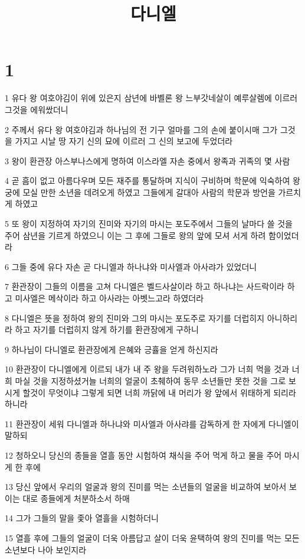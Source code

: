 

\title{다니엘}


\chapter{1}

\par 1 유다 왕 여호야김이 위에 있은지 삼년에 바벨론 왕 느부갓네살이 예루살렘에 이르러 그것을 에워쌌더니
\par 2 주께서 유다 왕 여호야김과 하나님의 전 기구 얼마를 그의 손에 붙이시매 그가 그것을 가지고 시날 땅 자기 신의 묘에 이르러 그 신의 보고에 두었더라
\par 3 왕이 환관장 아스부나스에게 명하여 이스라엘 자손 중에서 왕족과 귀족의 몇 사람
\par 4 곧 흠이 없고 아름다우며 모든 재주를 통달하며 지식이 구비하며 학문에 익숙하여 왕궁에 모실 만한 소년을 데려오게 하였고 그들에게 갈대아 사람의 학문과 방언을 가르치게 하였고
\par 5 또 왕이 지정하여 자기의 진미와 자기의 마시는 포도주에서 그들의 날마다 쓸 것을 주어 삼년을 기르게 하였으니 이는 그 후에 그들로 왕의 앞에 모셔 서게 하려 함이었더라
\par 6 그들 중에 유다 자손 곧 다니엘과 하나냐와 미사엘과 아사랴가 있었더니
\par 7 환관장이 그들의 이름을 고쳐 다니엘은 벨드사살이라 하고 하나냐는 사드락이라 하고 미사엘은 메삭이라 하고 아사랴는 아벳느고라 하였더라
\par 8 다니엘은 뜻을 정하여 왕의 진미와 그의 마시는 포도주로 자기를 더럽히지 아니하리라 하고 자기를 더럽히지 않게 하기를 환관장에게 구하니
\par 9 하나님이 다니엘로 환관장에게 은혜와 긍휼을 얻게 하신지라
\par 10 환관장이 다니엘에게 이르되 내가 내 주 왕을 두려워하노라 그가 너희 먹을 것과 너희 마실 것을 지정하셨거늘 너희의 얼굴이 초췌하여 동무 소년들만 못한 것을 그로 보시게 할것이 무엇이냐 그렇게 되면 너희 까닭에 내 머리가 왕 앞에서 위태하게 되리라 하니라
\par 11 환관장이 세워 다니엘과 하나냐와 미사엘과 아사랴를 감독하게 한 자에게 다니엘이 말하되
\par 12 청하오니 당신의 종들을 열흘 동안 시험하여 채식을 주어 먹게 하고 물을 주어 마시게 한 후에
\par 13 당신 앞에서 우리의 얼굴과 왕의 진미를 먹는 소년들의 얼굴을 비교하여 보아서 보이는 대로 종들에게 처분하소서 하매
\par 14 그가 그들의 말을 좇아 열흘을 시험하더니
\par 15 열흘 후에 그들의 얼굴이 더욱 아름답고 살이 더욱 윤택하여 왕의 진미를 먹는 모든 소년보다 나아 보인지라
